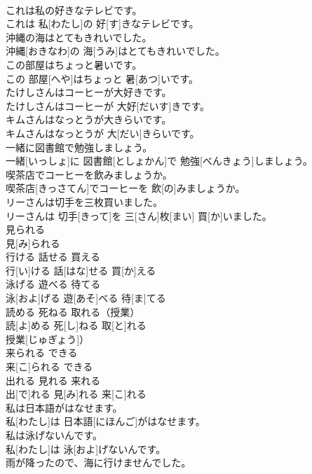 \documentclass[8pt]{extreport}
\begin{document}
\begin{CJK}{UTF8}{min}
\\	これは私の好きなテレビです。	
\\	これは 私[わたし]の 好[す]きなテレビです。	
\\	沖縄の海はとてもきれいでした。	
\\	沖縄[おきなわ]の 海[うみ]はとてもきれいでした。	
\\	この部屋はちょっと暑いです。	
\\	この 部屋[へや]はちょっと 暑[あつ]いです。	
\\	たけしさんはコーヒーが大好きです。	
\\	たけしさんはコーヒーが 大好[だいす]きです。	
\\	キムさんはなっとうが大きらいです。	
\\	キムさんはなっとうが 大[だい]きらいです。	
\\	一緒に図書館で勉強しましょう。	
\\	一緒[いっしょ]に 図書館[としょかん]で 勉強[べんきょう]しましょう。	
\\	喫茶店でコーヒーを飲みましょうか。	
\\	喫茶店[きっさてん]でコーヒーを 飲[の]みましょうか。	
\\	リーさんは切手を三枚買いました。	
\\	リーさんは 切手[きって]を 三[さん]枚[まい] 買[か]いました。	
\\	見られる	
\\	見[み]られる	
\\	行ける 話せる 買える	
\\	行[い]ける 話[はな]せる 買[か]える	
\\	泳げる 遊べる 待てる	
\\	泳[およ]げる 遊[あそ]べる 待[ま]てる	
\\	読める 死ねる 取れる（授業）	
\\	読[よ]める 死[し]ねる 取[と]れる
\\	授業[じゅぎょう]）	
\\	来られる できる	
\\	来[こ]られる できる	
\\	出れる 見れる 来れる	
\\	出[で]れる 見[み]れる 来[こ]れる	
\\	私は日本語がはなせます。	
\\	私[わたし]は 日本語[にほんご]がはなせます。	
\\	私は泳げないんです。	
\\	私[わたし]は 泳[およ]げないんです。	
\\	雨が降ったので、海に行けませんでした。	

\end{CJK}
\end{document}
